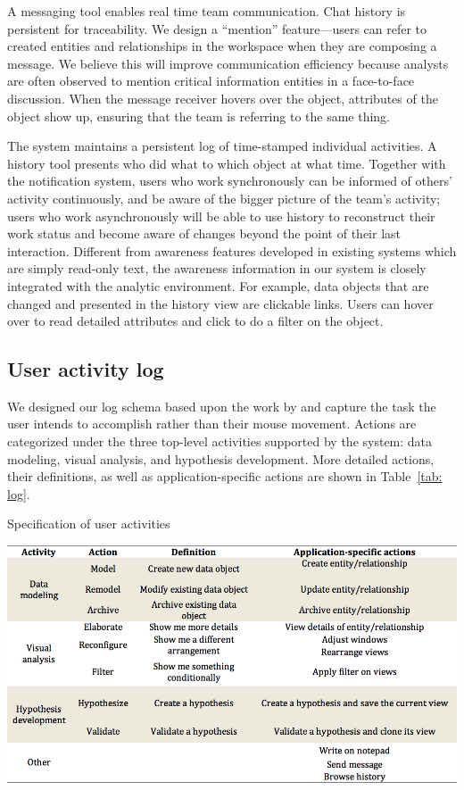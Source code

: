 A messaging tool enables real time team communication. Chat history is persistent
for traceability. We design a “mention” feature—users can refer to created
entities and relationships in the workspace when they are composing a message.
We believe this will improve communication efficiency because analysts are often
observed to mention critical information entities in a face-to-face discussion.
When the message receiver hovers over the object, attributes of the object show
up, ensuring that the team is referring to the same thing.

The system maintains a persistent log of time-stamped individual activities. A
history tool presents who did what to which object at what time. Together with the
notification system, users who work synchronously can be informed of others’
activity continuously, and be aware of the bigger picture of the team’s activity;
users who work asynchronously will be able to use history to reconstruct
their work status and become aware of changes beyond the point of their last
interaction. Different from awareness features developed in existing systems
which are simply read-only text, the awareness information in our system is
closely integrated with the analytic environment. For example, data objects that
are changed and presented in the history view are clickable links. Users can
hover over to read detailed attributes and click to do a filter on the object.

\subsection{User activity log}

We designed our log schema based upon the work by \cite{Yi2007} and
 capture the
task the user intends to accomplish rather than their mouse movement. Actions
are categorized under the three top-level activities supported by the system:
data modeling, visual analysis, and hypothesis development. More detailed
actions, their definitions, as well as application-specific actions are shown in
Table~\ref{tab: log}.

\begin{table}
	\caption{Specification of user activities}
	\label{tab: log}
	\includegraphics[width=\linewidth]{03-System/img/log_specification.png}
\end{table}


